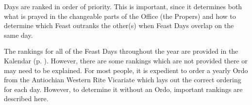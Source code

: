 {}\label{ranking}
\noindent
{} Days are ranked in order of priority. This is important, since it determines both what is prayed in the changeable parts of the Office (the Propers) and how to determine which Feast outranks the other(s) when Feast Days overlap on the same day.\par
The rankings for all of the Feast Days throughout the year are provided in the Kalendar (p. \pageref{kalendar}). However, there are some rankings which are not provided there or may need to be explained. For most people, it is expedient to order a yearly Ordo from the Antiochian Western Rite Vicariate which lays out the correct ordering for each day. However, to determine it without an Ordo, important rankings are described here.
